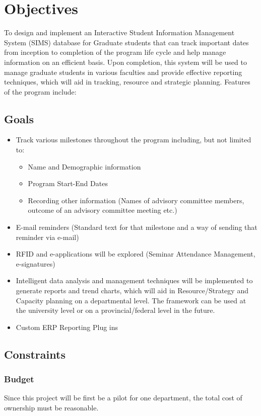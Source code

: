 \documentclass{journal}
\begin{document}
\section{Objectives}

To design and implement an Interactive Student Information Management System (SIMS) database for Graduate students that can track important dates from inception 
to completion of the program life cycle and help manage information on an efficient basis. Upon completion, this system will be used to manage graduate students 
in various faculties and provide effective reporting techniques, which will aid in tracking, resource and strategic planning. Features of the program include:

\subsection{ Goals }
\begin{itemize}
 \item{Track various milestones throughout the program including, but not limited to:}
 \begin{itemize}
   \item{ Name and Demographic information }
   \item{ Program Start-End Dates }
   \item{ Recording other information (Names of advisory committee members, outcome of an advisory committee meeting etc.) }
  \end{itemize}
  \item{ E-mail reminders (Standard text for that milestone and a way of sending that reminder via e-mail) }
  \item{ RFID and e-applications will be explored (Seminar Attendance Management, e-signatures) }
  \item{ Intelligent data analysis and management techniques will be implemented to generate reports and trend charts, which will aid in Resource/Strategy and Capacity planning on a departmental level. The framework can be used at the university level or on a provincial/federal level in the future. } 
  \item{ Custom ERP Reporting Plug ins }
\end{itemize}
\subsection{ Constraints }
\subsubsection{ Budget }
Since this project will be first be a pilot for one department, the total cost of ownership must be reasonable.
\end{document}

